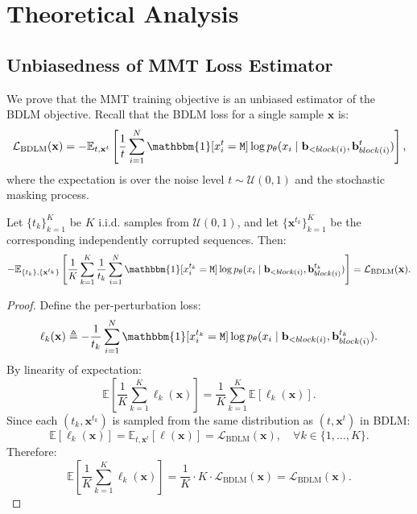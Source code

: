 \section{Theoretical Analysis}

\subsection{Unbiasedness of MMT Loss Estimator}
\label{app:unbiased}

We prove that the MMT training objective is an unbiased estimator of the BDLM objective. Recall that the BDLM loss for a single sample $\mathbf{x}$ is:
\begin{equation}
    \mathcal{L}_{\text{BDLM}}(\mathbf{x}) = -\mathbb{E}_{t, \mathbf{x}^t} \left[ \frac{1}{t} \sum_{i=1}^N \mathbbm{1}[x_i^t = \mathtt{M}] \log p_{\theta}(x_i \mid \mathbf{b}_{<block(i)}, \mathbf{b}_{block(i)}^t) \right],
\end{equation}
where the expectation is over the noise level $t \sim \mathcal{U}(0,1)$ and the stochastic masking process.

\begin{theorem}[Unbiasedness]
\label{thm:unbiased}
Let $\{t_k\}_{k=1}^K$ be $K$ i.i.d. samples from $\mathcal{U}(0,1)$, and let $\{\mathbf{x}^{t_k}\}_{k=1}^K$ be the corresponding independently corrupted sequences. Then:
\begin{equation}
    - \mathbb{E}_{\{t_k\}, \{\mathbf{x}^{t_k}\}} \left[ \frac{1}{K} \sum_{k=1}^K \frac{1}{t_k} \sum_{i=1}^N \mathbbm{1}[x_i^{t_k} = \mathtt{M}] \log p_{\theta}(x_i \mid \mathbf{b}_{<block(i)}, \mathbf{b}_{block(i)}^{t_k}) \right] = \mathcal{L}_{\text{BDLM}}(\mathbf{x}).
\end{equation}
\end{theorem}

\begin{proof}
Define the per-perturbation loss:
\begin{equation}
    \ell_k(\mathbf{x}) \triangleq -\frac{1}{t_k} \sum_{i=1}^N \mathbbm{1}[x_i^{t_k} = \mathtt{M}] \log p_{\theta}(x_i \mid \mathbf{b}_{<block(i)}, \mathbf{b}_{block(i)}^{t_k}).
\end{equation}
By linearity of expectation:
\begin{equation}
    \mathbb{E}\left[ \frac{1}{K} \sum_{k=1}^K \ell_k(\mathbf{x}) \right] = \frac{1}{K} \sum_{k=1}^K \mathbb{E}[\ell_k(\mathbf{x})].
\end{equation}
Since each $(t_k, \mathbf{x}^{t_k})$ is sampled from the same distribution as $(t, \mathbf{x}^t)$ in BDLM:
\begin{equation}
    \mathbb{E}[\ell_k(\mathbf{x})] = \mathbb{E}_{t, \mathbf{x}^t}[\ell(\mathbf{x})] = \mathcal{L}_{\text{BDLM}}(\mathbf{x}), \quad \forall k \in \{1, \ldots, K\}.
\end{equation}
Therefore:
\begin{equation}
    \mathbb{E}\left[ \frac{1}{K} \sum_{k=1}^K \ell_k(\mathbf{x}) \right] = \frac{1}{K} \cdot K \cdot \mathcal{L}_{\text{BDLM}}(\mathbf{x}) = \mathcal{L}_{\text{BDLM}}(\mathbf{x}).
\end{equation}
\end{proof}

